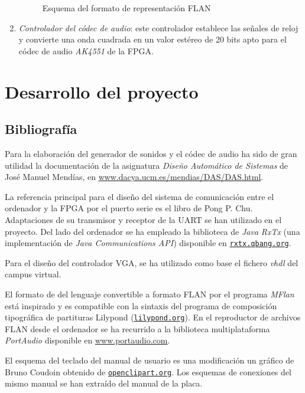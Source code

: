 \documentclass{article}
\begin{document}
\begin{enumerate}
\begin{figure}[ht]
		\caption{Esquema del formato de representación FLAN}
	\end{figure}

	\item {\itshape Controlador del códec de audio}: este controlador establece las señales de reloj y convierte una onda cuadrada en un valor estéreo de 20 bits apto para el códec de audio {\itshape AK4551} de la FPGA.
\end{enumerate}

\section{Desarrollo del proyecto}

\subsection{Bibliografía}
	Para la elaboración del generador de sonidos y el códec de audio ha sido de gran utilidad la documentación de la asignatura {\itshape Diseño Automático de Sistemas} de José Manuel Mendías, en \url{www.dacya.ucm.es/mendias/DAS/DAS.html}.

	\medskip La referencia principal para el diseño del sistema de comunicación entre el ordenador y la FPGA por el puerto serie es el libro \cite{PCHU} de Pong P. Chu. Adaptaciones de su transmisor y receptor de la UART se han utilizado en el proyecto. Del lado del ordenador se ha empleado la biblioteca de {\itshape Java} {\itshape RxTx} (una implementación de {\itshape Java Communications API}) disponible en \href{http://rxtx.qbang.org}{\nolinkurl{rxtx.qbang.org}}.

	\medskip Para el diseño del controlador VGA, se ha utilizado como base el fichero {\itshape vhdl} del campus virtual.

	\medskip El formato de del lenguaje convertible a formato FLAN por el programa {\itshape MFlan} está inspirado y es compatible con la sintaxis del programa de composición tipográfica de partituras Lilypond (\href{http://lilypond.org}{\nolinkurl{lilypond.org}}). En el reproductor de archivos FLAN desde el ordenador se ha recurrido a la biblioteca multiplataforma {\itshape PortAudio} disponible en \url{www.portaudio.com}.

	\medskip El esquema del teclado del manual de usuario es una modificación un gráfico de Bruno Coudoin obtenido de \href{http://openclipart.org}{\nolinkurl{openclipart.org}}. Los esquemas de conexiones del mismo manual se han extraído del manual de la placa.
\end{document}
